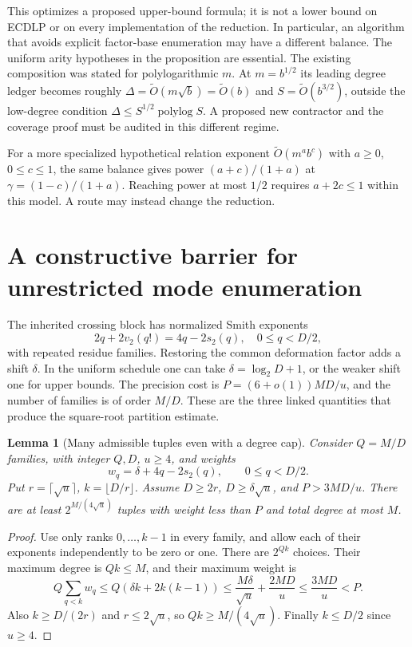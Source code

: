 \documentclass[11pt]{article}
\newtheorem{lemma}{Lemma}
\begin{document}
This optimizes a proposed upper-bound formula; it is not a lower bound
on ECDLP or on every implementation of the reduction. In particular,
an algorithm that avoids explicit factor-base enumeration may have a
different balance. The uniform arity hypotheses in the proposition
are essential. The existing composition was stated for polylogarithmic
$m$. At $m=b^{1/2}$ its leading degree ledger becomes roughly
$\Delta=\widetilde O(m\sqrt b)=\widetilde O(b)$ and
$S=\widetilde O(b^{3/2})$, outside the low-degree condition
$\Delta\le S^{1/2}\operatorname{polylog}S$. A proposed new contractor
and the coverage proof must be audited in this different regime.

For a more specialized hypothetical relation exponent
$\widetilde O(m^a b^c)$ with $a\ge0$, $0\le c\le1$, the same
balance gives power $(a+c)/(1+a)$ at
$\gamma=(1-c)/(1+a)$. Reaching power at most $1/2$ requires
$a+2c\le1$ within this model. A route may instead change the reduction.

\section{A constructive barrier for unrestricted mode enumeration}
The inherited crossing block has normalized Smith exponents
\[
 2q+2v_2(q!)=4q-2s_2(q),\quad 0\le q<D/2,
\]
with repeated residue families. Restoring the common deformation factor
adds a shift $\delta$. In the uniform schedule one can take
$\delta=\log_2D+1$, or the weaker shift one for upper bounds.
The precision cost is $P=(6+o(1))MD/u$, and the number of families
is of order $M/D$. These are the three linked quantities that produce
the square-root partition estimate.

\begin{lemma}[Many admissible tuples even with a degree cap]
Consider $Q=M/D$ families, with integer $Q,D$, $u\ge4$, and weights
\[
 w_q=\delta+4q-2s_2(q),\qquad 0\le q<D/2.
\]
Put $r=\lceil\sqrt u\rceil$, $k=\lfloor D/r\rfloor$.
Assume $D\ge2r$, $D\ge\delta\sqrt u$, and $P>3MD/u$.
There are at least $2^{M/(4\sqrt u)}$ tuples with weight less
than $P$ and total degree at most $M$.
\end{lemma}
\begin{proof}
Use only ranks $0,\ldots,k-1$ in every family, and allow each of
their exponents independently to be zero or one. There are $2^{Qk}$
choices. Their maximum degree is $Qk\le M$, and their maximum weight is
\[
 Q\sum_{q<k}w_q
 \le Q(\delta k+2k(k-1))
 \le \frac{M\delta}{\sqrt u}+\frac{2MD}{u}
 \le\frac{3MD}{u}<P.
\]
Also $k\ge D/(2r)$ and $r\le2\sqrt u$, so
$Qk\ge M/(4\sqrt u)$. Finally $k\le D/2$ since $u\ge4$.
\end{proof}
\end{document}
